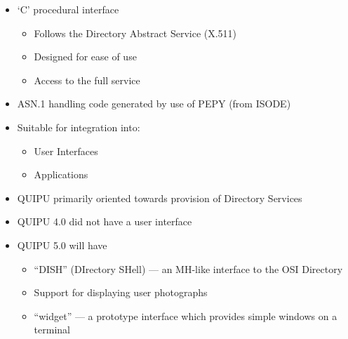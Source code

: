 \begin {bwslide}

\begin {itemize}
\item `C' procedural interface
\begin {itemize}
\item Follows the Directory Abstract Service (X.511)
\item Designed for ease of use
\item Access to the full service
\end {itemize}

\item ASN.1 handling code generated by use of PEPY (from ISODE)

\item Suitable for integration into:
\begin {itemize}
\item User Interfaces
\item Applications
\end {itemize}

\end {itemize}
\end {bwslide}



\begin {bwslide}

\begin {itemize}
\item QUIPU primarily oriented towards provision of Directory Services

\item QUIPU 4.0 did not have a user interface

\item QUIPU 5.0 will have
\begin {itemize}
\item ``DISH'' (DIrectory SHell) --- an MH-like interface to the OSI
Directory
\item Support for displaying user photographs
\item ``widget'' --- a prototype interface which provides simple windows on
a terminal
\end {itemize}

\end {itemize}
\end {bwslide}



